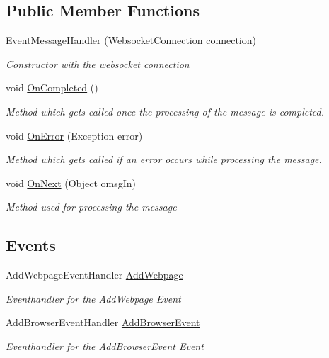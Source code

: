 \subsection*{Public Member Functions}
\begin{DoxyCompactItemize}
\item 
\hyperlink{class_web_analyzer_1_1_server_1_1_message_handler_1_1_event_message_handler_aad5a6a0c04c3734ed4f4f246429dcc96}{Event\+Message\+Handler} (\hyperlink{class_web_analyzer_1_1_server_1_1_websocket_connection}{Websocket\+Connection} connection)
\begin{DoxyCompactList}\small\item\em Constructor with the websocket connection \end{DoxyCompactList}\item 
void \hyperlink{class_web_analyzer_1_1_server_1_1_message_handler_1_1_event_message_handler_a19e447a4cbabc5a9f8b3a04af58c5d43}{On\+Completed} ()
\begin{DoxyCompactList}\small\item\em Method which gets called once the processing of the message is completed. \end{DoxyCompactList}\item 
void \hyperlink{class_web_analyzer_1_1_server_1_1_message_handler_1_1_event_message_handler_a88c6d373560e656f48dd245a60dd5050}{On\+Error} (Exception error)
\begin{DoxyCompactList}\small\item\em Method which gets called if an error occurs while processing the message. \end{DoxyCompactList}\item 
void \hyperlink{class_web_analyzer_1_1_server_1_1_message_handler_1_1_event_message_handler_ab517345494b9c59dcd2fefadcdc7b459}{On\+Next} (Object omsg\+In)
\begin{DoxyCompactList}\small\item\em Method used for processing the message \end{DoxyCompactList}\end{DoxyCompactItemize}
\subsection*{Events}
\begin{DoxyCompactItemize}
\item 
Add\+Webpage\+Event\+Handler \hyperlink{class_web_analyzer_1_1_server_1_1_message_handler_1_1_event_message_handler_afe82749d8d848e38bb19ddc56f9c7fe6}{Add\+Webpage}
\begin{DoxyCompactList}\small\item\em Eventhandler for the Add\+Webpage Event \end{DoxyCompactList}\item 
Add\+Browser\+Event\+Handler \hyperlink{class_web_analyzer_1_1_server_1_1_message_handler_1_1_event_message_handler_ab5371d9836863ebc41e4c86c9ebc348e}{Add\+Browser\+Event}
\begin{DoxyCompactList}\small\item\em Eventhandler for the Add\+Browser\+Event Event \end{DoxyCompactList}\end{DoxyCompactItemize}
